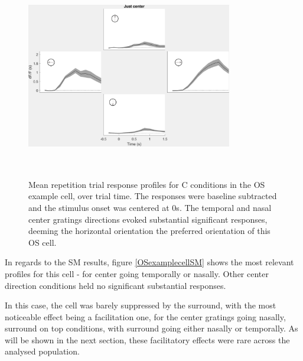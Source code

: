 \begin{figure}[H] \centering \includegraphics[width=9cm,height=9cm,keepaspectratio]{Figures/7.Results/individualSM/roi_46_mf379_pos2/center.png} 
\caption{Mean repetition trial response profiles for C conditions in the OS example cell, over trial time. The responses were baseline subtracted and the stimulus onset was centered at 0s. The temporal and nasal center gratings directions evoked substantial significant responses, deeming the horizontal orientation the preferred orientation of this OS cell.}
\label{OSexamplecellcenter}
\end{figure}

In regards to the SM results, figure \ref{OSexamplecellSM} shows the most relevant profiles for this cell - for center going temporally or nasally. Other center direction conditions held no significant substantial  responses. 

In this case, the cell was barely suppressed by the surround, with the most noticeable effect being a facilitation one, for the center gratings going nasally, surround on top conditions, with surround going either nasally or temporally. As will be shown in the next section, these facilitatory effects were rare across the analysed population.

